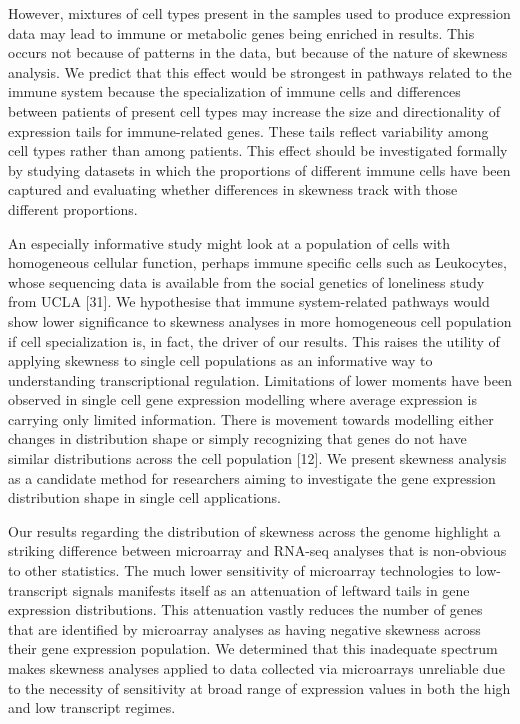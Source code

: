 \documentclass[11pt]{article}
\begin{document}
However, mixtures of cell types present in the samples used to produce expression data may lead to immune or metabolic genes being enriched in results. This occurs not because of patterns in the data, but because of the nature of skewness analysis. We predict that this effect would be strongest in pathways related to the immune system because the specialization of immune cells and differences between patients of present cell types may increase the size and directionality of expression tails for immune-related genes. These tails reflect variability among cell types rather than among patients. This effect should be investigated formally by studying datasets in which the proportions of different immune cells have been captured and evaluating whether differences in skewness track with those different proportions. 
\newline

An especially informative study might look at a population of cells with homogeneous cellular function, perhaps immune specific cells such as Leukocytes, whose sequencing data is available from the social genetics of loneliness study from UCLA [31]. We hypothesise that immune system-related pathways would show lower significance to skewness analyses in more homogeneous cell population if cell specialization is, in fact, the driver of our results. This raises the utility of applying skewness to single cell populations as an informative way to understanding transcriptional regulation. Limitations of lower moments have been observed in single cell gene expression modelling where average expression is carrying only limited information. There is movement towards modelling either changes in distribution shape or simply recognizing that genes do not have similar distributions across the cell population [12]. We present skewness analysis as a candidate method for researchers aiming to investigate the gene expression distribution shape in single cell applications.  
\newline

Our results regarding the distribution of skewness across the genome highlight a striking difference between microarray and RNA-seq analyses that is non-obvious to other statistics. The much lower sensitivity of microarray technologies to low-transcript signals manifests itself as an attenuation of leftward tails in gene expression distributions. This attenuation vastly reduces the number of genes that are identified by microarray analyses as having negative skewness across their gene expression population. We determined that this inadequate spectrum makes skewness analyses applied to data collected via microarrays unreliable due to the necessity of sensitivity at broad range of expression values in both the high and low transcript regimes. 
\newline
\end{document}
